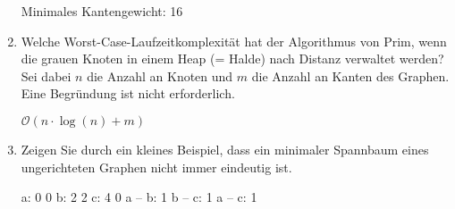 \documentclass{bschlangaul-aufgabe}
\begin{document}
\begin{enumerate}
\begin{bAntwort}
\begin{center}

\end{center}
Minimales Kantengewicht: 16
\end{bAntwort}


\item Welche Worst-Case-Laufzeitkomplexität hat der Algorithmus von
Prim, wenn die grauen Knoten in einem Heap (= Halde) nach Distanz
verwaltet werden? Sei dabei $n$ die Anzahl an Knoten und $m$ die Anzahl
an Kanten des Graphen. Eine Begründung ist nicht erforderlich.

\begin{bAntwort}
$\mathcal{O}(n \cdot \log(n) + m)$
\end{bAntwort}


\item Zeigen Sie durch ein kleines Beispiel, dass ein minimaler
Spannbaum eines ungerichteten Graphen nicht immer eindeutig ist.

\begin{bGraphenFormat}
a: 0 0
b: 2 2
c: 4 0
a -- b: 1
b -- c: 1
a -- c: 1
\end{bGraphenFormat}

\begin{bAntwort}
\hspace{0.5cm}
\hspace{0.5cm}
\end{bAntwort}
\end{enumerate}
\end{document}
